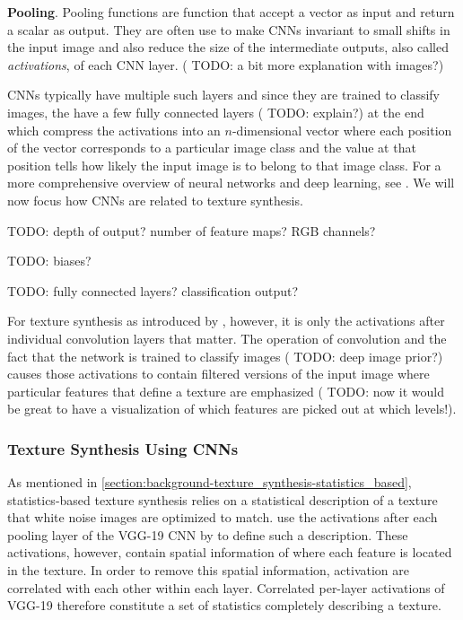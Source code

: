 \textbf{Pooling}. Pooling functions are function that accept a vector as input and return a scalar as output. They are often use to make CNNs invariant to small shifts in the input image and also reduce the size of the intermediate outputs, also called \textit{activations}, of each CNN layer. ({\color{red} TODO: a bit more explanation with images?})

CNNs typically have multiple such layers and since they are trained to classify images, the have a few fully connected layers ({\color{red} TODO:  explain?}) at the end which compress the activations into an \(n\)-dimensional vector where each position of the vector corresponds to a particular image class and the value at that position tells how likely the input image is to belong to that image class. For a more comprehensive overview of neural networks and deep learning, see \citet{Goodfellow2016}. We will now focus how CNNs are related to texture synthesis.

{\color{red} TODO: depth of output? number of feature maps? RGB channels?}

{\color{red} TODO: biases?}

{\color{red} TODO: fully connected layers? classification output?}

For texture synthesis as introduced by \citet{Gatys2015}, however, it is only the activations after individual convolution layers that matter. The operation of convolution and the fact that the network is trained to classify images ({\color{red} TODO: deep image prior?}) causes those activations to contain filtered versions of the input image where particular features that define a texture are emphasized ({\color{red} TODO: now it would be great to have a visualization of which features are picked out at which levels!}).

\subsubsection{Texture Synthesis Using CNNs}
\label{section:background-texture_synthesis-statistics_based-synthesis_using_cnns}

As mentioned in \ref{section:background-texture_synthesis-statistics_based}, statistics-based texture synthesis relies on a statistical description of a texture that white noise images are optimized to match. \citet{Gatys2015} use the activations after each pooling layer of the VGG-19 CNN by \citet{Simonyan2014} to define such a description. These activations, however, contain spatial information of where each feature is located in the texture. In order to remove this spatial information, activation are correlated with each other within each layer. Correlated per-layer activations of VGG-19 therefore constitute a set of statistics completely describing a texture.

